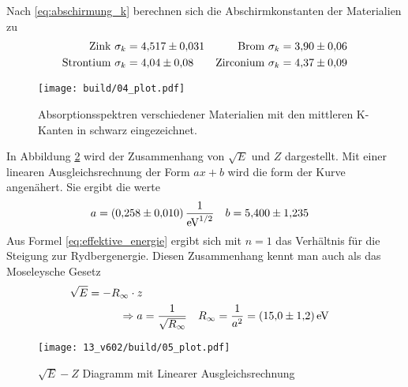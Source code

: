 \noindent
Nach \eqref{eq:abschirmung_k} berechnen sich die Abschirmkonstanten der Materialien zu
\begin{align*}
    \text{Zink      } \sigma_k &= \num{4.517 \pm 0.031} &
    \text{Brom      } \sigma_k &= \num{3.90 \pm 0.06} \\
    \text{Strontium } \sigma_k &= \num{4.04 \pm 0.08} &
    \text{Zirconium } \sigma_k &= \num{4.37 \pm 0.09} 
\end{align*}

\begin{figure}
    \centering
    \texttt{[image: build/04\_plot.pdf]}
    \caption{Absorptionsspektren verschiedener Materialien mit den mittleren K-Kanten in schwarz eingezeichnet.}
    \label{fig:04}
\end{figure}

In Abbildung \ref{fig:05} wird der Zusammenhang von $\sqrt{E}$ und $Z$ dargestellt.
Mit einer linearen Ausgleichsrechnung der Form $ax +b$ wird die form der Kurve angenähert.
Sie ergibt die werte
\begin{align}
    a &= \qty{0.258 \pm 0.010}{\electronvolt\tothe{-1/2}} &
    b &= \num{5.400 \pm 1.235}
\end{align}
Aus Formel \eqref{eq:effektive_energie} ergibt sich mit $n=1$ das Verhältnis für die Steigung zur Rydbergenergie.
Diesen Zusammenhang kennt man auch als das Moseleysche Gesetz
\begin{align*}
    \sqrt{E} = - R_\infty \cdot z\\
\Rightarrow    a &= \frac{1}{\sqrt{R_\infty}}
&    R_\infty = \frac{1}{a^2} &= \qty{15 \pm 1.2}{\eV}
\end{align*}


\begin{figure}
    \texttt{[image: 13\_v602/build/05\_plot.pdf]}
    \caption{$\sqrt{E}-Z$ Diagramm mit Linearer Ausgleichsrechnung }
    \label{fig:05}
\end{figure}


